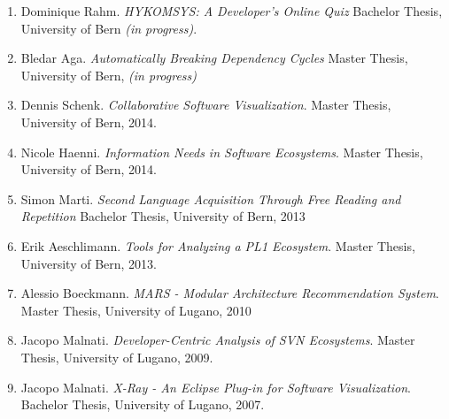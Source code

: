
\begin{enumerate}

\item Dominique Rahm. \emph{HYKOMSYS: A Developer's Online Quiz} Bachelor Thesis, University of Bern \emph{(in progress)}.

\item Bledar Aga. \emph{Automatically Breaking Dependency Cycles} Master Thesis, University of Bern, \emph{(in progress)}

\item Dennis Schenk. \emph{Collaborative Software Visualization}. Master Thesis, University of Bern, 2014.

\item Nicole Haenni. \emph {Information Needs in Software Ecosystems}. Master Thesis, University of Bern, 2014.

\item Simon Marti. \emph{Second Language Acquisition Through Free Reading and Repetition} Bachelor Thesis, University of Bern, 2013

\item Erik Aeschlimann. \emph {Tools for Analyzing a PL1 Ecosystem}. Master Thesis, University of Bern, 2013.

\item Alessio Boeckmann. \emph{MARS - Modular Architecture Recommendation System}. Master Thesis, University of Lugano, 2010

\item Jacopo Malnati. \emph{Developer-Centric Analysis of SVN Ecosystems}. Master Thesis, University of Lugano, 2009.

\item Jacopo Malnati. \emph{X-Ray - An Eclipse Plug-in for Software Visualization}. Bachelor Thesis, University of Lugano, 2007.

\end{enumerate}